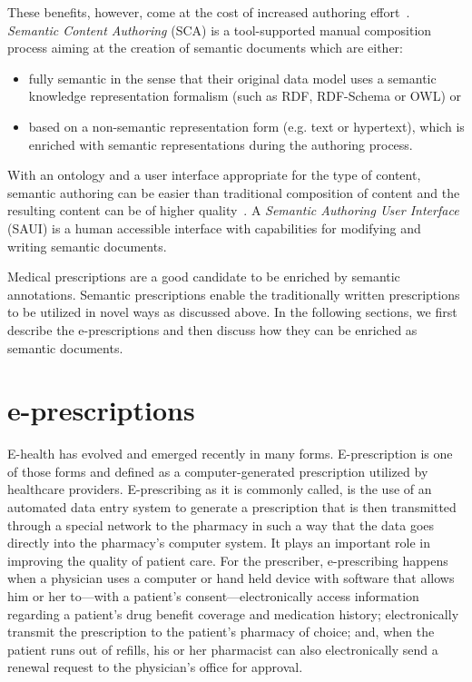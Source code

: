 \documentclass[10pt, conference, compsocconf]{IEEEtran}
\begin{document}
These benefits, however, come at the cost of increased authoring effort~\cite{hasida2007,uren2006}.
\emph{Semantic Content Authoring} (SCA) is a tool-supported manual composition process aiming at the creation of semantic documents which are either:
\begin{itemize}
	\item fully semantic in the sense that their original data model uses a semantic knowledge representation formalism (such as RDF, RDF-Schema or OWL) or
	\item based on a non-semantic representation form (e.g. text or hypertext), which is enriched with semantic representations during the authoring process.\\
\end{itemize}

With an ontology and a user interface appropriate for the type of content, semantic authoring can be easier than traditional composition of content and the resulting content can be of higher quality~\cite{hasida2007}.
A \emph{Semantic Authoring User Interface} (SAUI) is a human accessible interface with capabilities for modifying and writing semantic documents.

Medical prescriptions are a good candidate to be enriched by semantic annotations.
Semantic prescriptions enable the traditionally written prescriptions to be utilized in novel ways as discussed above.
In the following sections, we first describe the e-prescriptions and then discuss how they can be enriched as semantic documents.

\section{e-prescriptions}
\label{sec:epresc}
E-health has evolved and emerged recently in many forms.
E-prescription is one of those forms and defined as a computer-generated prescription utilized by healthcare providers.
E-prescribing as it is commonly called, is the use of an automated data entry system to generate a prescription that is then transmitted through a special network to the pharmacy in such a way that the data goes directly into the pharmacy’s computer system.
It plays an important role in improving the quality of patient care.
For the prescriber, e-prescribing happens when a physician uses a computer or hand held device with software that allows him or her to—with a patient’s consent—electronically access information regarding a patient’s drug benefit coverage and medication history; electronically transmit the prescription to the patient’s pharmacy of choice; and, when the patient runs out of refills, his or her pharmacist can also electronically send a renewal request to the physician’s office for approval.
\end{document}
